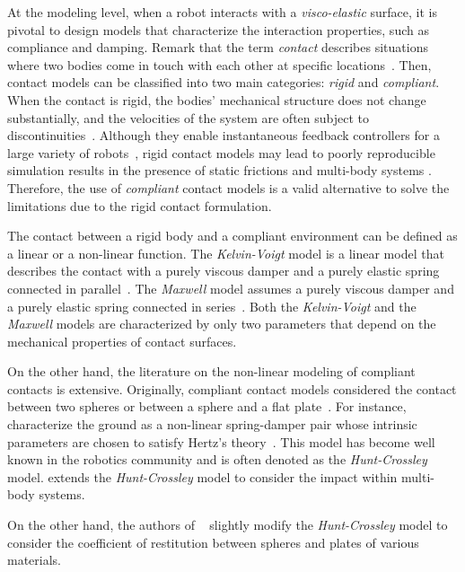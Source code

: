 \par 
At the modeling level, when a robot interacts with a \emph{visco-elastic} surface, it is pivotal to design models that characterize the interaction properties, such as compliance and damping. Remark that the term \emph{contact} describes situations where two bodies come in touch with each other at specific locations~\citep{Gilardi2002}. Then, contact models can be classified into two main categories: \emph{rigid} and \emph{compliant}. When the contact is rigid, the bodies' mechanical structure does not change substantially, and the velocities of the system are often subject to discontinuities~\citep{Whittaker1988}. Although they enable instantaneous feedback controllers for a large variety of robots~\citep{Englsberger2018}, rigid contact models may lead to poorly reproducible simulation results in the presence of static frictions and multi-body systems \citep{Mason1988a,Stronge1991}. Therefore, the use of \emph{compliant} contact models is a valid alternative to solve the limitations due to the rigid contact formulation. 
\par
The contact between a rigid body and a compliant environment can be defined as a linear or a non-linear function. The \emph{Kelvin-Voigt} model is a linear model that describes the contact with a purely viscous damper and a purely elastic spring connected in parallel~\citep{Hajikarimi2021MechanicalViscoelasticity}. The \emph{Maxwell} model assumes a purely viscous damper and a purely elastic spring connected in series~\citep{Hajikarimi2021MechanicalViscoelasticity}. Both the \emph{Kelvin-Voigt} and the \emph{Maxwell}  models are characterized by only two parameters that depend on the mechanical properties of contact surfaces.
\par
On the other hand, the literature on the non-linear modeling of compliant contacts is extensive. Originally, compliant contact models considered the contact between two spheres or between a sphere and a flat plate~\citep{Falcon1998BehaviorGround,Hunt1975CoefficientVibroimpact,Lankarani1990,Marhefka1999ASystems}. For instance, \cite{Hunt1975CoefficientVibroimpact} characterize the ground as a non-linear spring-damper pair whose intrinsic parameters are chosen to satisfy Hertz’s theory~\citep[Chapter~4]{Johnson1985ContactMechanics}. This model has become
well known in the robotics community and is often denoted as the \emph{Hunt-Crossley} model. \cite{Lankarani1990} extends the \emph{Hunt-Crossley} model to consider the impact within multi-body systems. 
\par
On the other hand, the authors of ~\citep{Azad2014} slightly modify the \emph{Hunt-Crossley} model to consider the coefficient of restitution between spheres and plates of various materials. 





